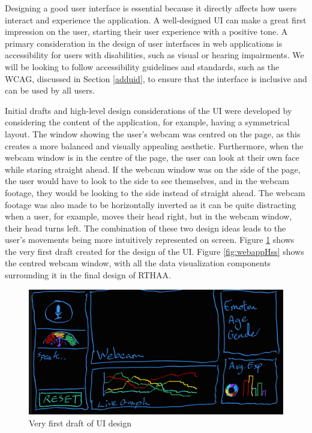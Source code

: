 \documentclass[12pt, a4paper]{article}
\newcommand{\np}
    {
    \vskip 0.4cm
    }
\begin{document}
Designing a good user interface is essential because it directly affects how users interact and experience the application. A well-designed UI can make a great first impression on the user, starting their user experience with a positive tone. A primary consideration in the design of user interfaces in web applications is accessibility for users with disabilities, such as visual or hearing impairments. We will be looking to follow accessibility guidelines and standards, such as the WCAG, discussed in Section \ref{adduid}, to ensure that the interface is inclusive and can be used by all users.
\np
Initial drafts and high-level design considerations of the UI were developed by considering the content of the application, for example, having a symmetrical layout. The window showing the user's webcam was centred on the page, as this creates a more balanced and visually appealing aesthetic. Furthermore, when the webcam window is in the centre of the page, the user can look at their own face while staring straight ahead. If the webcam window was on the side of the page, the user would have to look to the side to see themselves, and in the webcam footage, they would be looking to the side instead of straight ahead. The webcam footage was also made to be horizontally inverted as it can be quite distracting when a user, for example, moves their head right, but in the webcam window, their head turns left. The combination of these two design ideas leads to the user's movements being more intuitively represented on screen. Figure \ref{fig:uidraft} shows the very first draft created for the design of the UI. Figure \ref{fig:webappHss} shows the centred webcam window, with all the data visualization components surrounding it in the final design of RTHAA. 

\begin{figure}[H]
    \centering
    \includegraphics[scale=0.18]{images/uidraft.jpg}
    \caption{Very first draft of UI design}
    \label{fig:uidraft}
\end{figure}
\end{document}
